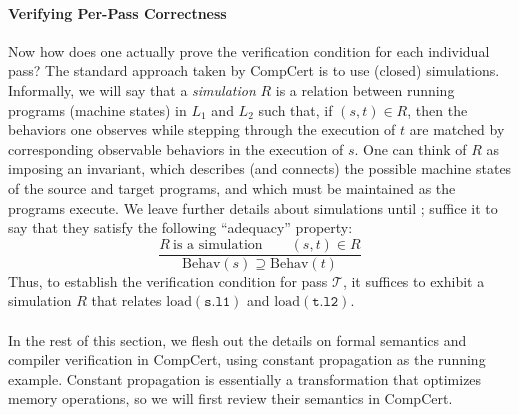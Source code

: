 


\paragraph{Verifying Per-Pass Correctness}

Now how does one actually prove the verification condition for each individual pass?  The standard
approach taken by CompCert is to use (closed) simulations.  Informally, we will say that a
\emph{simulation} $R$ is a relation between running programs (\ie machine states) in $L_1$ and $L_2$
such that, if $(s,t) \in R$, then the behaviors one observes while stepping through the execution of
$t$ are matched by corresponding observable behaviors in the execution of $s$.  One can think of $R$
as imposing an invariant, which describes (and connects) the possible machine states of the source
and target programs, and which must be maintained as the programs execute.  We leave further details
about simulations until ; suffice it to say that they satisfy the
following ``adequacy'' property:
\[
\frac{
R~\mbox{is a simulation} \qquad
(s,t)\in R
}{
\mathrm{Behav}(s) \supseteq \mathrm{Behav}(t)
}
\]
Thus, to establish the verification condition for pass $\mathcal{T}$, it suffices to exhibit a
simulation $R$ that relates $\mathrm{load}(\mathtt{s.l1})$ and $\mathrm{load}(\mathtt{t.l2})$.



\paragraph*{}

In the rest of this section, we flesh out the details on formal semantics and compiler verification
in CompCert, using constant propagation as the running example.  Constant propagation is essentially
a transformation that optimizes memory operations, so we will first review their semantics in
CompCert.

